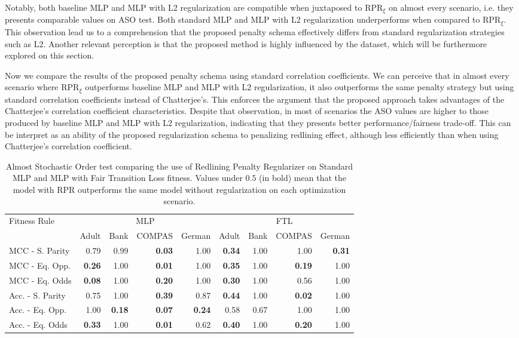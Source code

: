 Notably, both baseline MLP and MLP with L2 regularization are compatible when juxtaposed to RPR$_{\xi}$ on almost every scenario, i.e. they presents comparable values on ASO test. Both standard MLP and MLP with L2 regularization underperforms when compared to RPR$_{\xi}$. This observation lead us to a comprehension that the proposed penalty schema effectively differs from standard regularization strategies such as L2. Another relevant perception is that the proposed method is highly influenced by the dataset, which will be furthermore explored on this section.

Now we compare the results of the proposed penalty schema using standard correlation coefficients. We can perceive that in almost every scenario where RPR$_{\xi}$ outperforms baseline MLP and MLP with L2 regularization, it also outperforms the same penalty strategy but using standard correlation coefficients instead of Chatterjee's. This enforces the argument that the proposed approach takes advantages of the Chatterjee's correlation coefficient characteristics. Despite that observation, in most of scenarios the ASO values are higher to those produced by baseline MLP and MLP with L2 regularization, indicating that they presents better performance/fairness trade-off. This can be interpret as an ability of the proposed regularization schema to penalizing redlining effect, although less efficiently than when using Chatterjee's correlation coefficient.

\begin{table}[ht]
\centering
\caption{Almost Stochastic Order test comparing the use of Redlining Penalty Regularizer on Standard MLP and MLP with Fair Transition Loss fitness. Values under $0.5$ (in bold) mean that the model with RPR outperforms the same model without regularization on each optimization scenario.} \label{tab:aso_compare_rpr}
{\footnotesize
\begin{tabular}{lrrrr|rrrr}
\toprule
\multirow{2}{*}{Fitness Rule} & \multicolumn{4}{c}{MLP} & \multicolumn{4}{c}{FTL} \\
& Adult & Bank & COMPAS & German & Adult & Bank & COMPAS & German \\
\midrule
MCC - S. Parity & 0.79 & 0.99 & \textbf{0.03} & 1.00 & \textbf{0.34} & 1.00 & 1.00 & \textbf{0.31} \\
MCC - Eq. Opp. & \textbf{0.26} & 1.00 & \textbf{0.01} & 1.00 & \textbf{0.35} & 1.00 & \textbf{0.19} & 1.00 \\
MCC - Eq. Odds & \textbf{0.08} & 1.00 & \textbf{0.20} & 1.00 & \textbf{0.30} & 1.00 & 0.56 & 1.00 \\
Acc. - S. Parity & 0.75 & 1.00 & \textbf{0.39} & 0.87 & \textbf{0.44} & 1.00 & \textbf{0.02} & 1.00 \\
Acc. - Eq. Opp. & 1.00 & \textbf{0.18} & \textbf{0.07} & \textbf{0.24} & 0.58 & 0.67 & 1.00 & 1.00 \\
Acc. - Eq. Odds & \textbf{0.33} & 1.00 & \textbf{0.01} & 0.62 & \textbf{0.40} & 1.00 & \textbf{0.20} & 1.00 \\
\bottomrule
\end{tabular}
}
\end{table}


